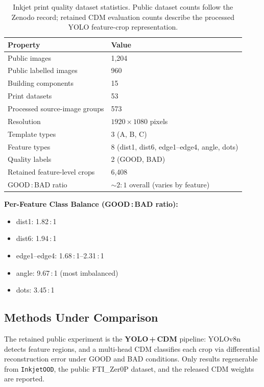 \begin{table}[htbp]
  \centering
  \caption{Inkjet print quality dataset statistics. Public dataset
    counts follow the Zenodo record; retained CDM evaluation counts
    describe the processed YOLO feature-crop representation.}
  \label{tab:exp:inkjet-statistics}
  \begin{tabular}{ll}
    \toprule
    Property & Value \\
    \midrule
    Public images       & 1,204 \\
    Public labelled images & 960 \\
    Building components & 15 \\
    Print datasets      & 53 \\
    Processed source-image groups & 573 \\
    Resolution          & $1920 \times 1080$ pixels \\
    Template types      & 3 (A, B, C) \\
    Feature types       & 8 (dist1, dist6, edge1--edge4, angle, dots) \\
    Quality labels      & 2 (GOOD, BAD) \\
    Retained feature-level crops & 6,408 \\
    GOOD\,:\,BAD ratio  & ${\sim}2{:}1$ overall (varies by feature) \\
    \bottomrule
  \end{tabular}
\end{table}

\noindent\textbf{Per-Feature Class Balance (GOOD\,:\,BAD ratio):}
\begin{itemize}
  \item dist1: 1.82\,:\,1
  \item dist6: 1.94\,:\,1
  \item edge1--edge4: 1.68\,:\,1--2.31\,:\,1
  \item angle: 9.67\,:\,1 (most imbalanced)
  \item dots: 3.45\,:\,1
\end{itemize}

\subsection{Methods Under Comparison}
\label{sec:exp:inkjet:methods}

The retained public experiment is the \textbf{YOLO\,+\,CDM} pipeline:
YOLOv8n detects feature regions, and a multi-head CDM classifies each
crop via differential reconstruction error under GOOD and BAD conditions.
Only results regenerable from \texttt{InkjetOOD}, the public FTI\_Zer0P
dataset, and the released CDM weights are reported.

